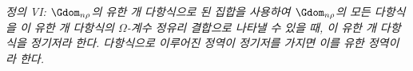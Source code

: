 
\emph{정의 VI: $\Gdom_{n\rho}$의 유한 개 다항식으로 된 집합을 사용하여 $\Gdom_{n\rho}$의 모든 다항식을 이 유한 개 다항식의 $\Omega$-계수 정유리 결합으로 나타낼 수 있을 때, 이 유한 개 다항식을 정기저라 한다. 다항식으로 이루어진 정역이 정기저를 가지면 이를 유한 정역이라 한다.}
